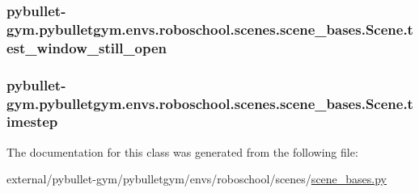 \subsubsection[{\texorpdfstring{test\+\_\+window\+\_\+still\+\_\+open}{test_window_still_open}}]{\setlength{\rightskip}{0pt plus 5cm}pybullet-\/gym.\+pybulletgym.\+envs.\+roboschool.\+scenes.\+scene\+\_\+bases.\+Scene.\+test\+\_\+window\+\_\+still\+\_\+open}\hypertarget{classpybullet-gym_1_1pybulletgym_1_1envs_1_1roboschool_1_1scenes_1_1scene__bases_1_1_scene_ac95f7a610a1a8ccc6eb246a6b07a4f2c}{}\label{classpybullet-gym_1_1pybulletgym_1_1envs_1_1roboschool_1_1scenes_1_1scene__bases_1_1_scene_ac95f7a610a1a8ccc6eb246a6b07a4f2c}
\subsubsection[{\texorpdfstring{timestep}{timestep}}]{\setlength{\rightskip}{0pt plus 5cm}pybullet-\/gym.\+pybulletgym.\+envs.\+roboschool.\+scenes.\+scene\+\_\+bases.\+Scene.\+timestep}\hypertarget{classpybullet-gym_1_1pybulletgym_1_1envs_1_1roboschool_1_1scenes_1_1scene__bases_1_1_scene_a1997157029b12afc5cb924a639af5df3}{}\label{classpybullet-gym_1_1pybulletgym_1_1envs_1_1roboschool_1_1scenes_1_1scene__bases_1_1_scene_a1997157029b12afc5cb924a639af5df3}


The documentation for this class was generated from the following file\+:\begin{DoxyCompactItemize}
\item 
external/pybullet-\/gym/pybulletgym/envs/roboschool/scenes/\hyperlink{roboschool_2scenes_2scene__bases_8py}{scene\+\_\+bases.\+py}\end{DoxyCompactItemize}
